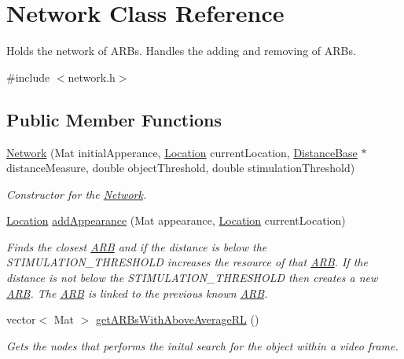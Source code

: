 \hypertarget{class_network}{}\section{Network Class Reference}
\label{class_network}


Holds the network of A\+R\+Bs. Handles the adding and removing of A\+R\+Bs.  




{\ttfamily \#include $<$network.\+h$>$}

\subsection*{Public Member Functions}
\begin{DoxyCompactItemize}
\item 
\hyperlink{class_network_abf40cbcbed14ec61e7a6d2b8e1dc6a1a}{Network} (Mat initial\+Apperance, \hyperlink{struct_a_i_s___options_1_1_location}{Location} current\+Location, \hyperlink{class_distance_base}{Distance\+Base} $\ast$distance\+Measure, double object\+Threshold, double stimulation\+Threshold)
\begin{DoxyCompactList}\small\item\em Constructor for the \hyperlink{class_network}{Network}. \end{DoxyCompactList}\item 
\hyperlink{struct_a_i_s___options_1_1_location}{Location} \hyperlink{class_network_a13011652e7fb84154942625ad3eb66c8}{add\+Appearance} (Mat appearance, \hyperlink{struct_a_i_s___options_1_1_location}{Location} current\+Location)
\begin{DoxyCompactList}\small\item\em Finds the closest \hyperlink{class_a_r_b}{A\+R\+B} and if the distance is below the S\+T\+I\+M\+U\+L\+A\+T\+I\+O\+N\+\_\+\+T\+H\+R\+E\+S\+H\+O\+L\+D increases the resource of that \hyperlink{class_a_r_b}{A\+R\+B}. If the distance is not below the S\+T\+I\+M\+U\+L\+A\+T\+I\+O\+N\+\_\+\+T\+H\+R\+E\+S\+H\+O\+L\+D then creates a new \hyperlink{class_a_r_b}{A\+R\+B}. The \hyperlink{class_a_r_b}{A\+R\+B} is linked to the previous known \hyperlink{class_a_r_b}{A\+R\+B}. \end{DoxyCompactList}\item 
vector$<$ Mat $>$ \hyperlink{class_network_afcd78f9225ca2f2f92d1b1db870ffb65}{get\+A\+R\+Bs\+With\+Above\+Average\+R\+L} ()
\begin{DoxyCompactList}\small\item\em Gets the nodes that performs the inital search for the object within a video frame. \end{DoxyCompactList}\item 

\end{DoxyCompactItemize}
